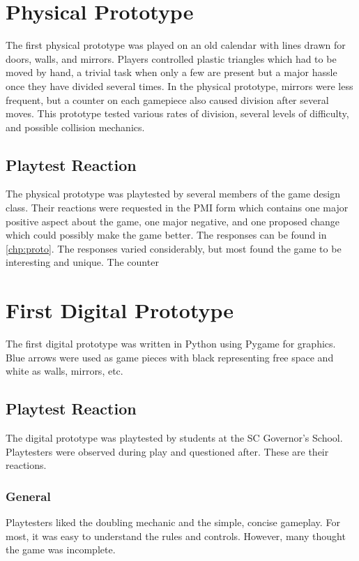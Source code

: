 \documentclass{scrreprt}
\begin{document}
		\section{Physical Prototype}
			The first physical prototype was played on an old calendar with lines drawn for doors, walls, and mirrors. Players controlled plastic triangles which had to be moved by hand, a trivial task when only a few are present but a major hassle once they have divided several times. In the physical prototype, mirrors were less frequent, but a counter on each gamepiece also caused division after several moves. This prototype tested various rates of division, several levels of difficulty, and possible collision mechanics.
			
			\subsection{Playtest Reaction}
				The physical prototype was playtested by several members of the game design class. Their reactions were requested in the PMI form which contains one major positive aspect about the game, one major negative, and one proposed change which could possibly make the game better. The responses can be found in \autoref{chp:proto}. The responses varied considerably, but most found the game to be interesting and unique. The counter 
		
		\section{First Digital Prototype}
			The first digital prototype was written in Python using Pygame for graphics. Blue arrows were used as game pieces with black representing free space and white as walls, mirrors, etc.
			
			\subsection{Playtest Reaction}
				The digital prototype was playtested by students at the SC Governor's School. Playtesters were observed during play and questioned after. These are their reactions.
				
				\subsubsection{General}
					Playtesters liked the doubling mechanic and the simple, concise gameplay. For most, it was easy to understand the rules and controls. However, many thought the game was incomplete.
					
\end{document}
